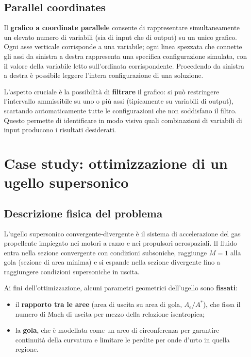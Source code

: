 \subsection{Parallel coordinates}

Il \textbf{grafico a coordinate parallele} consente di rappresentare
simultaneamente un elevato numero di variabili (sia di input che di
output) su un unico grafico.
Ogni asse verticale corrisponde a una variabile; ogni linea spezzata
che connette gli assi da sinistra a destra rappresenta una specifica
configurazione simulata, con il valore della variabile letto
sull'ordinata corrispondente.
Procedendo da sinistra a destra è possibile leggere l'intera
configurazione di una soluzione.

L'aspetto cruciale è la possibilità di \textbf{filtrare} il grafico:
si può restringere l'intervallo ammissibile su uno o più assi
(tipicamente su variabili di output), scartando automaticamente tutte
le configurazioni che non soddisfano il filtro.
Questo permette di identificare in modo visivo quali combinazioni di
variabili di input producono i risultati desiderati.

\section{Case study: ottimizzazione di un ugello supersonico}
\label{sec:ugello}

\subsection{Descrizione fisica del problema}

L'ugello supersonico convergente-divergente è il sistema di accelerazione
del gas propellente impiegato nei motori a razzo e nei propulsori
aerospaziali.
Il fluido entra nella sezione convergente con condizioni subsoniche,
raggiunge $M = 1$ alla gola (sezione di area minima) e si espande nella
sezione divergente fino a raggiungere condizioni supersoniche in uscita.

Ai fini dell'ottimizzazione, alcuni parametri geometrici dell'ugello sono
\textbf{fissati}:
\begin{itemize}
    \item il \textbf{rapporto tra le aree} (area di uscita su area di
    gola, $A_e/A^*$), che fissa il numero di Mach di uscita per mezzo
    della relazione isentropica;
    \item la \textbf{gola}, che è modellata come un arco di
    circonferenza per garantire continuità della curvatura e limitare
    le perdite per onde d'urto in quella regione.
\end{itemize}

